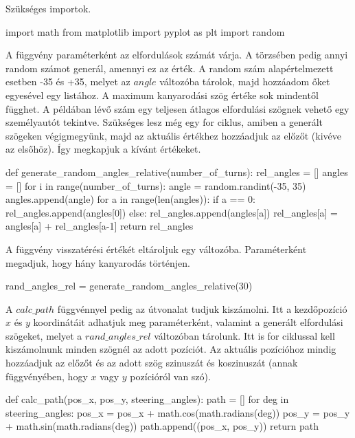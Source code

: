 Szükséges importok.
\begin{python}
import math
from matplotlib import pyplot as plt
import random
\end{python}

A függvény paraméterként az elfordulások számát várja. A törzsében pedig annyi random számot generál, amennyi ez az érték. A random szám alapértelmezett esetben -35 és +35, melyet az $ angle $ változóba tárolok, majd hozzáadom őket egyesével egy listához. A maximum kanyarodási szög értéke sok mindentől függhet. A példában lévő szám egy teljesen átlagos elfordulási szögnek vehető egy személyautót tekintve. Szükséges lesz még egy for ciklus, amiben a generált szögeken végigmegyünk, majd az aktuális értékhez hozzáadjuk az előzőt (kivéve az elsőhöz). Így megkapjuk a kívánt értékeket. 

\begin{python}
def generate_random_angles_relative(number_of_turns):
        rel_angles = []
        angles = []
        for i in range(number_of_turns):
            angle = random.randint(-35, 35)
            angles.append(angle)
        for a in range(len(angles)):
            if a == 0:
                rel_angles.append(angles[0])
            else:
                rel_angles.append(angles[a])
                rel_angles[a] = angles[a] + rel_angles[a-1]
        return rel_angles
\end{python}

A függvény visszatérési értékét eltároljuk egy változóba. Paraméterként megadjuk, hogy hány kanyarodás történjen.

\begin{python}
rand_angles_rel = generate_random_angles_relative(30)
\end{python}

A $calc\_path$ függvénnyel pedig az útvonalat tudjuk kiszámolni. Itt a kezdőpozíció $ x $ és $ y $ koordinátáit adhatjuk meg paraméterként, valamint a generált elfordulási szögeket, melyet a $rand\_angles\_rel$ változóban tárolunk. Itt is for ciklussal kell kiszámolnunk minden szögnél az adott pozíciót. Az aktuális pozícióhoz mindig hozzáadjuk az előzőt és az adott szög szinuszát és koszinuszát (annak függvényében, hogy $ x $ vagy $ y $ pozícióról van szó). 

\begin{python}
def calc_path(pos_x, pos_y, steering_angles):
        path = []
        for deg in steering_angles:
            pos_x = pos_x + math.cos(math.radians(deg))
            pos_y = pos_y + math.sin(math.radians(deg))
            path.append((pos_x, pos_y))
        return path
\end{python}

